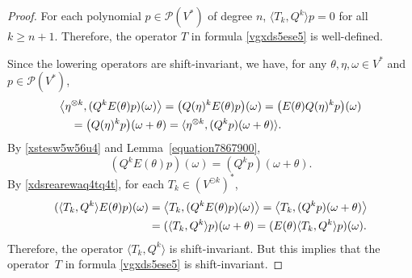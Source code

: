 \documentclass[12pt]{article}
\theoremstyle{remark}
\theoremstyle{remark}
\theoremstyle{remark}
\begin{document}
\begin{proof} For each polynomial $p\in\mathcal P(V^*)$ of degree $n$, $\langle T_k,
Q^{k}\rangle  p=0$ for all $k\ge n+1$. Therefore, the operator $T$ in formula \eqref{vgxds5ese5} is well-defined.


Since the lowering operators are shift-invariant, we have, for any $\theta,\eta,\omega \in V^*$ and $p\in\mathcal P(V^*)$,
\begin{align}
&\big\langle\eta^{\otimes k},(Q^{k}E(\theta)p)(\omega)\big\rangle=\big(Q(\eta)^kE(\theta)p\big)(\omega)=\big(E(\theta)Q(\eta)^k p\big)(\omega)\notag\\
&\quad =\big( Q(\eta)^k p\big)(\omega+\theta)=\langle\eta^{\otimes k},(Q^{k}p)(\omega+\theta)\rangle.\label{xstesw5w56u4}
\end{align}
By  \eqref{xstesw5w56u4} and Lemma~\ref{equation7867900},
\begin{equation}\label{xdsrearewaq4tq4t}
(Q^{k}E(\theta)p)(\omega)=(Q^{k}p)(\omega+\theta).
\end{equation}
By \eqref{xdsrearewaq4tq4t}, for each $T_k\in(V^{\odot k})^*$,
\begin{align} (\langle T_k,
Q^{k}\rangle E(\theta)p)(\omega)&=\big\langle T_k, (Q^{k}E(\theta)p)(\omega)\big\rangle=
\big\langle T_k,(Q^{k}p)(\omega+\theta)\big\rangle\notag\\
&=(\langle T_k,
Q^{k}\rangle p)(\omega+\theta)=(E(\theta)\langle T_k,
Q^{k}\rangle p)(\omega).\label{vcrsa4wa4tq2y6}
\end{align}
Therefore, the operator $\langle T_k,
Q^{k}\rangle $ is shift-invariant. But this implies that the operator~$T$ in formula \eqref{vgxds5ese5}  is shift-invariant.    


\end{proof}
\end{document}
